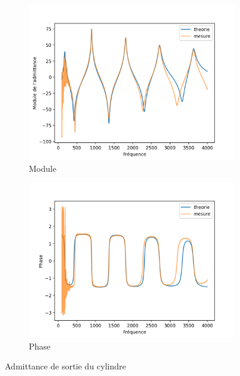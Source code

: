 \documentclass[atiam, article]{rapport} %
\begin{document}
\begin{figure}[H]
  \centering
  \begin{subfigure}[b]{.45\textwidth}
    \centering
    \includegraphics[width=\textwidth]{vents/images_vents/admittance_cylindre_amp.png}
    \caption{Module}
    \label{subfig:admittance_cylindre_amp}
  \end{subfigure}
  \begin{subfigure}[b]{.45\textwidth}
    \centering
    \includegraphics[width=\textwidth]{vents/images_vents/admittance_cylindre_phase.png}
    \caption{Phase}
    \label{subfig:admittance_cylindre_phase}
  \end{subfigure}
  \caption{Admittance de sortie du cylindre}
  \label{fig:admittance_cyl}
\end{figure}
\end{document}
